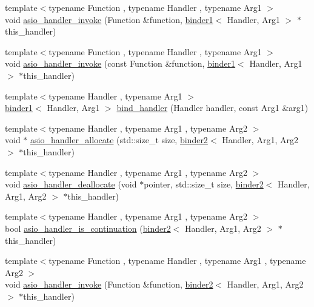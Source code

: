 \begin{DoxyCompactItemize}
\item 
{\footnotesize template$<$typename Function , typename Handler , typename Arg1 $>$ }\\void \hyperlink{namespaceasio_1_1detail_af834558e14dfd95876f6e6f42ff04db8}{asio\+\_\+handler\+\_\+invoke} (Function \&function, \hyperlink{classasio_1_1detail_1_1binder1}{binder1}$<$ Handler, Arg1 $>$ $\ast$this\+\_\+handler)
\item 
{\footnotesize template$<$typename Function , typename Handler , typename Arg1 $>$ }\\void \hyperlink{namespaceasio_1_1detail_a5340e3b222123bba01970c6d09e75d8a}{asio\+\_\+handler\+\_\+invoke} (const Function \&function, \hyperlink{classasio_1_1detail_1_1binder1}{binder1}$<$ Handler, Arg1 $>$ $\ast$this\+\_\+handler)
\item 
{\footnotesize template$<$typename Handler , typename Arg1 $>$ }\\\hyperlink{classasio_1_1detail_1_1binder1}{binder1}$<$ Handler, Arg1 $>$ \hyperlink{namespaceasio_1_1detail_af9740afe095e80f9323f4e853491c4dd}{bind\+\_\+handler} (Handler handler, const Arg1 \&arg1)
\item 
{\footnotesize template$<$typename Handler , typename Arg1 , typename Arg2 $>$ }\\void $\ast$ \hyperlink{namespaceasio_1_1detail_aa7438acd3a6bf9022eeb0f24aa48e767}{asio\+\_\+handler\+\_\+allocate} (std\+::size\+\_\+t size, \hyperlink{classasio_1_1detail_1_1binder2}{binder2}$<$ Handler, Arg1, Arg2 $>$ $\ast$this\+\_\+handler)
\item 
{\footnotesize template$<$typename Handler , typename Arg1 , typename Arg2 $>$ }\\void \hyperlink{namespaceasio_1_1detail_aa4d07b19957262376e4b9a7f7640b479}{asio\+\_\+handler\+\_\+deallocate} (void $\ast$pointer, std\+::size\+\_\+t size, \hyperlink{classasio_1_1detail_1_1binder2}{binder2}$<$ Handler, Arg1, Arg2 $>$ $\ast$this\+\_\+handler)
\item 
{\footnotesize template$<$typename Handler , typename Arg1 , typename Arg2 $>$ }\\bool \hyperlink{namespaceasio_1_1detail_a6bc6b9eb932640daeb02cb4fa27f9faf}{asio\+\_\+handler\+\_\+is\+\_\+continuation} (\hyperlink{classasio_1_1detail_1_1binder2}{binder2}$<$ Handler, Arg1, Arg2 $>$ $\ast$this\+\_\+handler)
\item 
{\footnotesize template$<$typename Function , typename Handler , typename Arg1 , typename Arg2 $>$ }\\void \hyperlink{namespaceasio_1_1detail_a1e130a1ec3fc644e0673656bc497d78e}{asio\+\_\+handler\+\_\+invoke} (Function \&function, \hyperlink{classasio_1_1detail_1_1binder2}{binder2}$<$ Handler, Arg1, Arg2 $>$ $\ast$this\+\_\+handler)

\end{DoxyCompactItemize}
